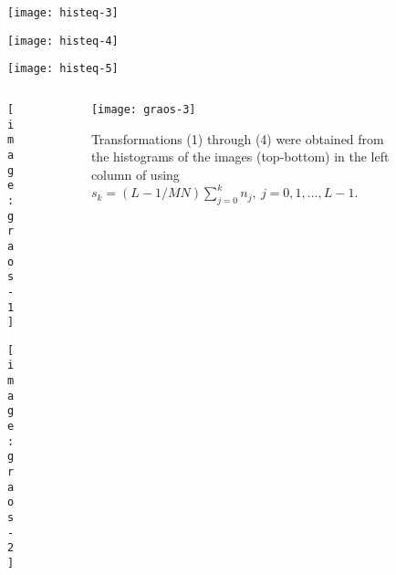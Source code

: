 
\begin{frame}
\begin{figure}
\centering
\texttt{[image: histeq-3]}
\end{figure}
\end{frame}


\begin{frame}
\begin{figure}
\centering
\texttt{[image: histeq-4]}
\end{figure}
\end{frame}


\begin{frame}
\begin{figure}
\centering
\texttt{[image: histeq-5]}
\end{figure}
\end{frame}


\begin{frame}
\begin{columns}
\begin{column}{.5\textwidth}
\begin{figure}
\centering
\texttt{[image: graos-1]}
\end{figure}
\begin{figure}
\centering
\texttt{[image: graos-2]}
\end{figure}
\end{column}
\begin{column}{.5\textwidth}
\begin{figure}
\centering
\texttt{[image: graos-3]}
\caption{Transformations (1) through (4) were obtained from the histograms of the images (top-bottom) in the left column of using $s_{k} = (L-1/MN)\sum_{j=0}^{k} n_{j},\ j=0,1,\ldots,L-1$.}
\end{figure}
\end{column}
\end{columns}
\end{frame}

